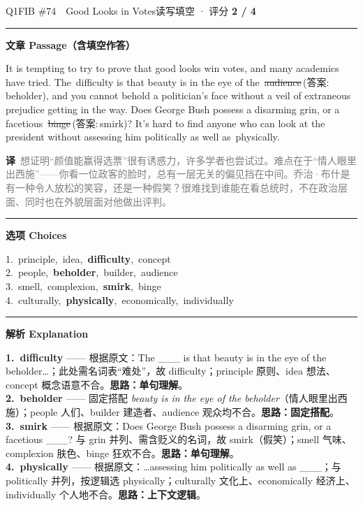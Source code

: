 \documentclass[11pt]{article}
\newcommand{\ptesub}[1]{%
  \par\needspace{2\baselineskip}\smallskip
  {\color{cAccent}\rule[-0.2ex]{3pt}{1.05em}}\hspace{6pt}%
  {\bfseries\color{cHead}#1}\par\nopagebreak\smallskip}
\newcommand{\zh}[1]{{\footnotesize\textcolor{cNote}{\textbf{译}}\ \textcolor{gray}{#1}}}
\newcommand{\rok}[1]{{\color{cFix}\ding{51}\,#1}}                 %
\newcommand{\rno}[2]{{\color{cWrong}\ding{55}\,\sout{#1}}\,{\footnotesize\color{cFix}(答案:\,#2)}}  %
\begin{document}
\begin{qblock}{Q1\quad FIB \#74\ \ Good Looks in Votes}{读写填空 · 评分 \textcolor{cAccent}{\bfseries 2 / 4}}
\ptesub{文章 Passage（含填空作答）}
\begin{promptbox}
It is tempting to try to prove that good looks win votes, and many academics have tried. The \rok{difficulty} is that beauty is in the eye of the \rno{audience}{beholder}, and you cannot behold a politician's face without a veil of extraneous prejudice getting in the way. Does George Bush possess a disarming grin, or a facetious \rno{binge}{smirk}? It's hard to find anyone who can look at the president without assessing him politically as well as \rok{physically}.
\end{promptbox}
\zh{想证明“颜值能赢得选票”很有诱惑力，许多学者也尝试过。难点在于“情人眼里出西施”——你看一位政客的脸时，总有一层无关的偏见挡在中间。乔治·布什是有一种令人放松的笑容，还是一种假笑？很难找到谁能在看总统时，不在政治层面、同时也在外貌层面对他做出评判。}
\ptesub{选项 Choices}
{\small
1.\ principle,\ idea,\ \textbf{difficulty},\ concept\\
2.\ people,\ \textbf{beholder},\ builder,\ audience\\
3.\ smell,\ complexion,\ \textbf{smirk},\ binge\\
4.\ culturally,\ \textbf{physically},\ economically,\ individually}
\ptesub{解析 Explanation}
\begin{notebox}\footnotesize
\textbf{1.\ difficulty} —— 根据原文：The \_\_\_ is that beauty is in the eye of the beholder…；此处需名词表“难处”，故 difficulty；principle 原则、idea 想法、concept 概念语意不合。\textbf{思路：单句理解}。\\[2pt]
\textbf{2.\ beholder} —— 固定搭配 \emph{beauty is in the eye of the beholder}（情人眼里出西施）；people 人们、builder 建造者、audience 观众均不合。\textbf{思路：固定搭配}。\\[2pt]
\textbf{3.\ smirk} —— 根据原文：Does George Bush possess a disarming grin, or a facetious \_\_\_? 与 grin 并列、需含贬义的名词，故 smirk（假笑）；smell 气味、complexion 肤色、binge 狂欢不合。\textbf{思路：单句理解}。\\[2pt]
\textbf{4.\ physically} —— 根据原文：…assessing him politically as well as \_\_\_；与 politically 并列，按逻辑选 physically；culturally 文化上、economically 经济上、individually 个人地不合。\textbf{思路：上下文逻辑}。
\end{notebox}
\end{qblock}
\end{document}
